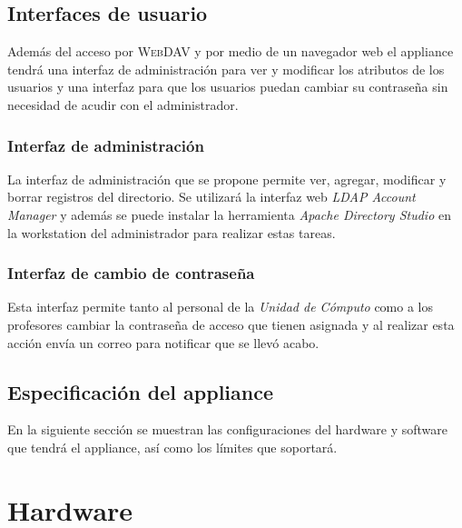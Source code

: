       \subsection {Interfaces de usuario}

Adem\'{a}s del acceso por \textsc{WebDAV} y por medio de un navegador web el appliance tendr\'{a} una interfaz de administraci\'{o}n para ver y modificar los atributos de los usuarios y una interfaz para que los usuarios puedan cambiar su contrase\~{n}a sin necesidad de acudir con el administrador.

        \subsubsection {Interfaz de administraci\'{o}n}

La interfaz de administraci\'{o}n que se propone permite ver, agregar, modificar y borrar registros del directorio. Se utilizar\'{a} la interfaz web \textit{LDAP Account Manager} y adem\'{a}s se puede instalar la herramienta \textit{Apache Directory Studio} en la workstation del administrador para realizar  estas tareas.

        \subsubsection {Interfaz de cambio de contrase\~{n}a}

Esta interfaz permite tanto al personal de la \textit{Unidad de C\'{o}mputo} como a los profesores cambiar la contrase\~{n}a de acceso que tienen asignada y al realizar esta acci\'{o}n env\'{i}a un correo para notificar que se llev\'{o} acabo.

    \subsection {Especificaci\'{o}n del appliance}

En la siguiente secci\'{o}n se muestran las configuraciones del hardware y software que tendr\'{a} el appliance, as\'{i} como los l\'{i}mites que soportar\'{a}.

      \section {Hardware}

